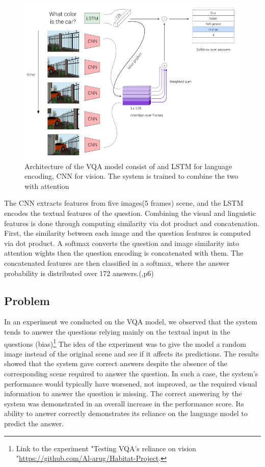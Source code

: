\begin{figure}[H]
\centering
\includegraphics[scale=0.35]{images/VQA.png}
\caption{Architecture of the VQA model consist of and LSTM for language encoding, CNN for vision. The system is trained to combine the two with attention}
\label{fig:VQ}
\end{figure}



The CNN extracts features from five images(5 frames) scene, and the LSTM encodes the textual features of the question. Combining the visual and linguistic features is done through computing similarity via dot product and concatenation. First, the similarity between each image and the question features is computed via dot product. A softmax converts the question and image similarity into attention wights then the question encoding is concatenated with them. The concatenated features are then classified in a softmax, where the answer probability is distributed over 172 answers.(\cite{embodiedqa},p6)



\subsection{Problem}

In an experiment we conducted on the VQA model, we observed that the system tends to answer the questions relying mainly on the textual input in the questions (bias)\footnote{ Link to the experiment "Testing VQA's reliance on vision "\url{https://github.com/Al-arug/Habitat-Project}.} The idea of the experiment was to give the model a random image instead of the original scene and see if it affects its predictions. The results showed that the system gave correct answers despite the absence of the corresponding scene required to answer the question. In such a case, the system's performance would typically have worsened, not improved, as the required visual information to answer the question is missing. The correct answering by the system was demonstrated in an overall increase in the performance score. Its ability to answer correctly demonstrates its reliance on the language model to predict the answer. 

